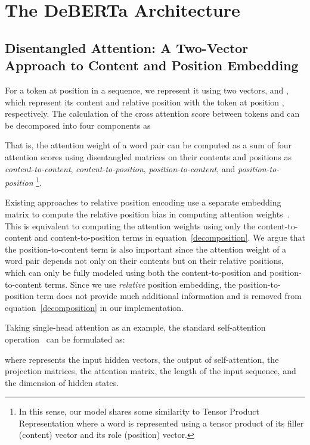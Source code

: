 \documentclass{article}
\def\eqref#1{equation~\ref{#1}}
\begin{document}
 
\section{The DeBERTa Architecture}
\subsection{Disentangled Attention: A Two-Vector Approach to Content and Position Embedding}
For a token at position  in a sequence, we represent it using two vectors,  and , 
which represent its content and relative position with the token at position , respectively.
The calculation of the cross attention score between tokens  and  can be decomposed into four components as

That is, the attention weight of a word pair can be computed as a sum of four attention scores using disentangled matrices on their contents and positions as  
\textit{content-to-content}, \textit{content-to-position}, \textit{position-to-content}, and \textit{position-to-position}
\footnote{In this sense, our model shares some similarity to Tensor Product Representation \citep{smolensky1990ptr,schlag2019enhancing,chen2019natural} where a word is represented using a tensor product of its filler (content) vector and its role (position) vector.}. 



Existing approaches to relative position encoding use a separate embedding matrix to compute the relative position bias in computing attention weights~\citep{shaw2018self, huang2018music}. 
This is equivalent to computing the attention weights using only the  content-to-content and content-to-position terms in \eqref{decomposition}.
We argue that the position-to-content term is also important since the attention weight of a word pair depends not only on their contents but on their relative positions, which can only be fully modeled using both the content-to-position and position-to-content terms.
Since we use \emph{relative} position embedding, the position-to-position term does not provide much additional information and is removed from \eqref{decomposition} in our implementation.





Taking single-head attention as an example, the standard self-attention operation~\citep{vaswani2017attention} can be formulated as:  
  
where  represents the input hidden vectors,  the output of self-attention,  the projection matrices,  the attention matrix,  the length of the input sequence, and  the dimension of hidden states.
\end{document}
